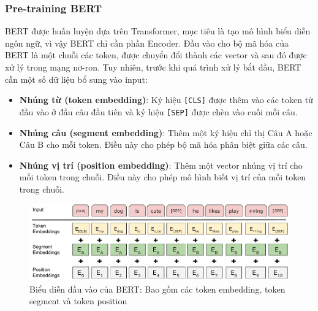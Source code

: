 \subsubsection{Pre-training BERT}

BERT được huấn luyện dựa trên Transformer, mục tiêu là tạo mô hình biểu diễn ngôn ngữ, vì vậy BERT chỉ cần phần Encoder. Đầu vào cho bộ mã hóa của BERT là một chuỗi các token, được chuyển đổi thành các vector và sau đó được xử lý trong mạng nơ-ron. Tuy nhiên, trước khi quá trình xử lý bắt đầu, BERT cần một số dữ liệu bổ sung vào input:

\begin{itemize}
    \item \textbf{Nhúng từ (token embedding)}: Ký hiệu {\tt [CLS]} được thêm vào các token từ đầu vào ở đầu câu đầu tiên và ký hiệu {\tt [SEP]} được chèn vào cuối mỗi câu.
    \item \textbf{Nhúng câu (segment embedding)}: Thêm một ký hiệu chỉ thị Câu A hoặc Câu B cho mỗi token. Điều này cho phép bộ mã hóa phân biệt giữa các câu.
    \item \textbf{Nhúng vị trí (position embedding)}: Thêm một vector nhúng vị trí cho mỗi token trong chuỗi. Điều này cho phép mô hình biết vị trí của mỗi token trong chuỗi.
\end{itemize}

\begin{figure}[htb]
    \centering
    \includegraphics[width=\textwidth]{image/Input_Emebeddings.pdf}
    \caption{Biểu diễn đầu vào của BERT: Bao gồm các token embedding, token segment và token position \cite{47751}}
    \label{figure:Input_Emebeddings}
\end{figure}

